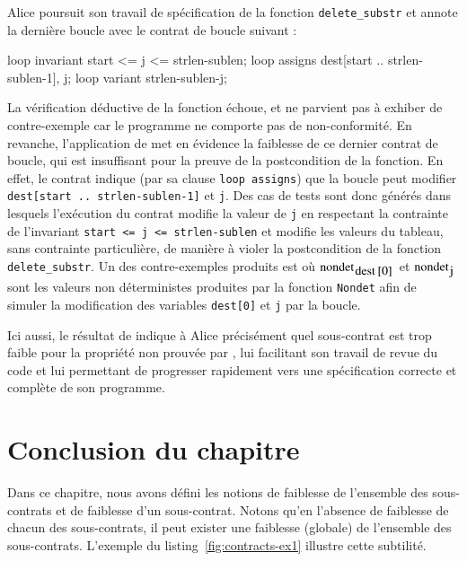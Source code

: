 Alice poursuit son travail de spécification de la fonction
\lstinline'delete_substr' et annote la dernière boucle avec le contrat de boucle
suivant :

\begin{pretty-codeACSL}
loop invariant start <= j <= strlen-sublen;
loop assigns dest[start .. strlen-sublen-1], j;
loop variant strlen-sublen-j;
\end{pretty-codeACSL}

La vérification déductive de la fonction échoue, et \NCD ne parvient pas à
exhiber de contre-exemple car le programme ne comporte pas de non-conformité.
En revanche, l'application de \SWD met en évidence la faiblesse de ce dernier
contrat de boucle, qui est insuffisant pour la preuve de la postcondition de la
fonction.
En effet, le contrat indique (par sa clause \lstinline'loop assigns') que la
boucle peut modifier \lstinline'dest[start .. strlen-sublen-1]' et
\lstinline'j'.
Des cas de tests sont donc générés dans lesquels l'exécution du
contrat modifie la valeur de \lstinline'j' en respectant la contrainte de
l'invariant \lstinline'start <= j <= strlen-sublen' et modifie les valeurs du
tableau, sans contrainte particulière, de manière à violer la postcondition de
la fonction \lstinline'delete_substr'.
Un des contre-exemples produits est  où $\mbox{\lstinline'nondet'}_{\mbox{\lstinline'dest[0]'}}$ et
$\mbox{\lstinline'nondet'}_{\mbox{\lstinline'j'}}$ sont les valeurs non
déterministes produites par la fonction \lstinline'Nondet' afin de simuler la
modification des variables \lstinline'dest[0]' et \lstinline'j' par la boucle.

Ici aussi, le résultat de \SWD indique à Alice précisément quel
sous-contrat est trop faible pour la propriété non prouvée par \Wp, lui
facilitant son travail de revue du code et lui permettant de progresser
rapidement vers une spécification correcte et complète de son programme.


\section*{Conclusion du chapitre}


Dans ce chapitre, nous avons défini les notions de faiblesse de l'ensemble des
sous-contrats et de faiblesse d'un sous-contrat.
Notons qu'en l'absence de faiblesse de chacun des sous-contrats, il peut exister
une faiblesse (globale) de l'ensemble des sous-contrats.
L'exemple du listing~\ref{fig:contracts-ex1} illustre cette subtilité.

